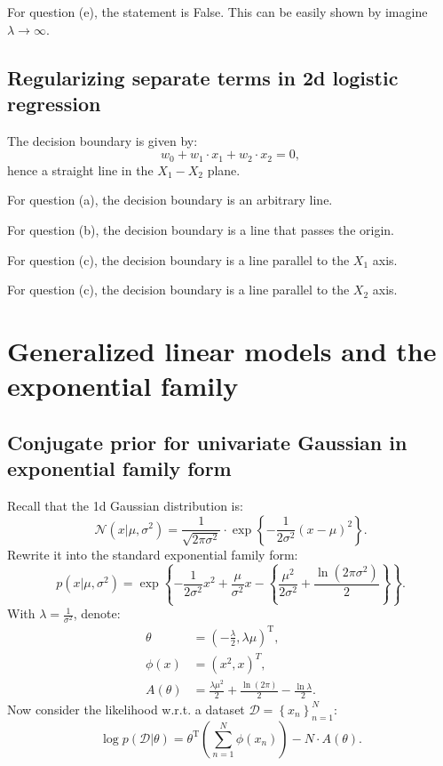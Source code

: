 \documentclass[UTF8]{ctexart}
\begin{document}
For question (e), the statement is False.
This can be easily shown by imagine $\lambda\rightarrow\infty$.

\subsection{Regularizing separate terms in 2d logistic regression}
The decision boundary is given by:
$$w_{0}+w_{1}\cdot x_{1}+w_{2}\cdot x_{2}=0,$$
hence a straight line in the $X_{1}-X_{2}$ plane.

For question (a), the decision boundary is an arbitrary line.

For question (b), the decision boundary is a line that passes the origin.

For question (c), the decision boundary is a line parallel to the $X_{1}$ axis.

For question (c), the decision boundary is a line parallel to the $X_{2}$ axis.

\newpage
\section{Generalized linear models and the exponential family}
\subsection{Conjugate prior for univariate Gaussian in exponential family form}
Recall that the 1d Gaussian distribution is:
$$\mathcal{N}(x|\mu,\sigma^{2})=\frac{1}{\sqrt{2\pi \sigma^{2}}}\cdot\exp\left\{-\frac{1}{2\sigma^{2}}(x-\mu)^{2} \right\}.$$
Rewrite it into the standard exponential family form:
$$p(x|\mu,\sigma^{2})=\exp\left\{-\frac{1}{2\sigma^{2}}x^{2} + \frac{\mu}{\sigma^{2}}x -\left\{\frac{\mu^{2}}{2\sigma^{2}}+\frac{\ln(2\pi\sigma^{2})}{2}\right\}  \right\}.$$
With $\lambda=\frac{1}{\sigma^{2}}$, denote:
$$
\begin{aligned}
\theta &= (-\frac{\lambda}{2},\lambda\mu)^{\text{T}},\\
\phi(x)&=(x^{2},x)^{T},\\
A(\theta) &=\frac{\lambda\mu^{2}}{2}+\frac{\ln(2\pi)}{2}-\frac{\ln \lambda}{2}.
\end{aligned}
$$
Now consider the likelihood w.r.t. a dataset $\mathcal{D}=\left\{x_{n} \right\}_{n=1}^{N}$:
$$\log p(\mathcal{D}|\theta) =\theta^{\text{T}}\left(\sum_{n=1}^{N}\phi(x_{n})\right) -N\cdot A(\theta). $$
\end{document}

